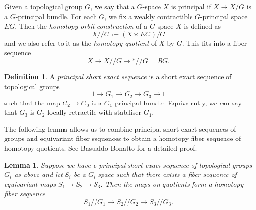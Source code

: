 \documentclass{amsart}
\theoremstyle{plain}
\newtheorem{lem}[thm]{Lemma}
\theoremstyle{definition}
\newtheorem{defn}[thm]{Definition}
\newcommand{\hq}{/\!\!/} %
\begin{document}
Given a topological group $G$, we say that a $G$-space $X$ is principal if $X \to X/G$ is a $G$-principal bundle. 
For each $G$, we fix a weakly contractible $G$-principal space $EG$.
Then the \emph{homotopy orbit construction} of a $G$-space $X$ is defined as
\[
    X \hq G := (X \times EG)/G
\]
and we also refer to it as the \emph{homotopy quotient} of $X$ by $G$.
This fits into a fiber sequence
\[
    X \longrightarrow X\hq G \longrightarrow * \hq G = BG.
\]

\begin{defn}\label{defn: principal ses}
    A \emph{principal short exact sequence} is a short exact sequence of topological groups
    \[
        1 \to G_1 \to G_2 \to G_3 \to 1
    \]
    such that the map $G_2 \to G_3$ is a $G_1$-principal bundle.
    Equivalently, we can say that $G_3$ is $G_2$-locally retractile with stabiliser $G_1$.
\end{defn}

The following lemma allows us to combine principal short exact sequences of groups and equivariant fiber sequences to obtain a homotopy fiber sequence of homotopy quotients.
See Basualdo Bonatto \cite[Corollary 2.11]{bonatto2023} for a detailed proof.
\begin{lem}\label{lem:fiberseq/fiberseq}
    Suppose we have a principal short exact sequence of topological groups $G_i$ as above and let $S_i$ be a $G_i$-space such that there exists a fiber sequence of equivariant maps
    $S_1 \to S_2 \to S_3$.
    Then the maps on quotients form a homotopy fiber sequence
    \[
        S_1 \hq G_1 \longrightarrow S_2 \hq G_2 \longrightarrow S_3 \hq G_3.
    \]
\end{lem}
\end{document}
